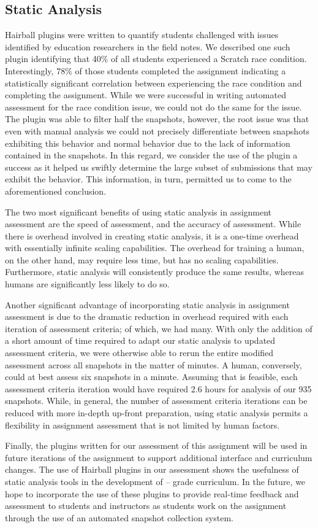 \subsection{Static Analysis}
Hairball plugins were written to quantify students challenged with issues
identified by education researchers in the field notes. We described one such
plugin identifying that 40\% of all students experienced a Scratch race
condition. Interestingly, 78\% of those students completed the assignment
indicating a statistically significant correlation between experiencing the
race condition and completing the assignment. While we were successful in
writing automated assessment for the race condition issue, we could not do the
same for the \dce{} issue. The plugin was able to filter half the snapshots,
however, the root issue was that even with manual analysis we could not
precisely differentiate between snapshots exhibiting this behavior and normal
behavior due to the lack of information contained in the snapshots. In this
regard, we consider the use of the plugin a success as it helped us swiftly
determine the large subset of submissions that may exhibit the behavior. This
information, in turn, permitted us to come to the aforementioned conclusion.

The two most significant benefits of using static analysis in assignment
assessment are the speed of assessment, and the accuracy of assessment. While
there is overhead involved in creating static analysis, it is a one-time
overhead with essentially infinite scaling capabilities. The overhead for
training a human, on the other hand, may require less time, but has no scaling
capabilities. Furthermore, static analysis will consistently produce the same
results, whereas humans are significantly less likely to do so.

Another significant advantage of incorporating static analysis in assignment
assessment is due to the dramatic reduction in overhead required with each
iteration of assessment criteria; of which, we had many. With only the addition
of a short amount of time required to adapt our static analysis to updated
assessment criteria, we were otherwise able to rerun the entire modified
assessment across all snapshots in the matter of minutes. A human, conversely,
could at best assess six snapshots in a minute. Assuming that is feasible, each
assessment criteria iteration would have required 2.6 hours for analysis of our
935 snapshots. While, in general, the number of assessment criteria iterations
can be reduced with more in-depth up-front preparation, using static analysis
permits a flexibility in assignment assessment that is not limited by human
factors.

Finally, the plugins written for our assessment of this assignment will be used
in future iterations of the assignment to support additional interface and
curriculum changes. The use of Hairball plugins in our assessment shows the
usefulness of static analysis tools in the development of --
grade curriculum. In the future, we hope to incorporate the use of these
plugins to provide real-time feedback and assessment to students and
instructors as students work on the assignment through the use of an automated
snapshot collection system.

